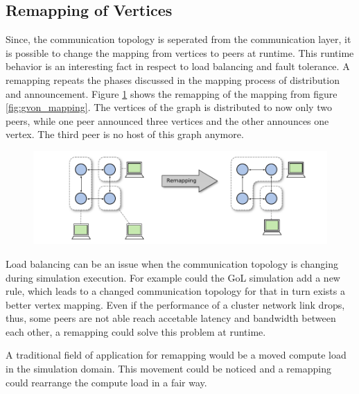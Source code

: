 \subsection{Remapping of Vertices}
\label{sec:remapping}
Since, the communication topology is seperated from the communication
layer, it is possible to change the mapping from vertices to peers at
runtime. This runtime behavior is an interesting fact in respect to
load balancing and fault tolerance. A remapping repeats the phases
discussed in the mapping process of distribution and announcement.
Figure \ref{fig:gvon_remapping} shows the remapping of the mapping
from figure \ref{fig:gvon_mapping}. The vertices of the graph is
distributed to now only two peers, while one peer announced three
vertices and the other announces one vertex. The third peer is no
host of this graph anymore.

\begin{figure}[H]
  \centering \includegraphics[width=\textwidth]{graphics/30_gvon_remapping}
  \caption{}
  \label{fig:gvon_remapping}
\end{figure}

Load balancing can be an issue when the communication topology is
changing during simulation execution. For example could the GoL
simulation add a new rule, which leads to a changed communication
topology for that in turn exists a better vertex mapping. Even if the
performance of a cluster network link drops, thus, some peers are not
able reach accetable latency and bandwidth between each other, a
remapping could solve this problem at runtime.

A traditional field of application for remapping would be
a moved compute load in the simulation domain. This movement
could be noticed and a remapping could rearrange the compute load
in a fair way.

